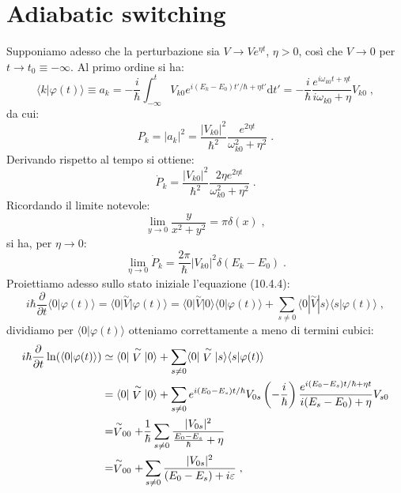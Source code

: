 \documentclass[10pt,a4paper]{report}
\theoremstyle{definition}
\numberwithin{equation}{section}
\newcommand{\diff}[1][]{\mathrm{d}#1}
\newcommand{\bra}{\langle}
\newcommand{\ket}{\rangle}
\begin{document}
\section{Adiabatic switching}
Supponiamo adesso che la perturbazione sia $V\to Ve^{\eta t}$, $\eta>0$, così che $V\to 0$ per $t\to t_0\equiv -\infty$. Al primo ordine si ha:
\begin{equation}
\bra k|\varphi(t)\ket\equiv a_k=-\frac{i}{\hbar}\int_{-\infty}^t V_{k0}e^{i(E_k-E_0)t'/\hbar+\eta t'}\diff{t}'=
-\frac{i}{\hbar}\frac{e^{i\omega_{k0}t+\eta t}}{i\omega_{k0}+\eta}V_{k0}\;,
\end{equation}
da cui:
\begin{equation}
P_k=|a_k|^2=\frac{|V_{k0}|^2}{\hbar^2}\frac{e^{2\eta t}}{\omega_{k0}^2+\eta^2}\;.
\end{equation}
Derivando rispetto al tempo si ottiene:
\begin{equation}
\dot{P}_k=\frac{|V_{k0}|^2}{\hbar^2}\frac{2\eta e^{2\eta t}}{\omega_{k0}^2+\eta^2}\;.
\end{equation}
Ricordando il limite notevole:
\begin{equation}
\lim_{y\to 0}\frac{y}{x^2+y^2}=\pi\delta(x)\;,
\end{equation}
si ha, per $\eta\to 0$:
\begin{equation}
\lim_{\eta\to 0}\dot{P}_k=\frac{2\pi}{\hbar}|V_{k0}|^2\delta(E_k-E_0)\;.
\end{equation}
Proiettiamo adesso sullo stato iniziale l'equazione (10.4.4):
\begin{equation}
i\hbar\frac{\partial}{\partial t}\bra 0|\varphi(t)\ket=\bra 0|\stackrel{\sim}{V}|\varphi(t)\ket=
\bra 0|\stackrel{\sim}{V}|0\ket\bra 0|\varphi(t)\ket+\sum_{s\ne 0}\bra 0|\stackrel{\sim}{V}|s\ket\bra s|\varphi(t)\ket\;,
\end{equation}
dividiamo per $\bra 0|\varphi(t)\ket$ otteniamo correttamente a meno di termini cubici:
\begin{align}
i\hbar\frac{\partial}{\partial t}\ln(\bra 0|\varphi(t)\ket)&\simeq \bra 0|\stackrel{\sim}{V}|0\ket+\sum_{s\ne 0}\bra 0|\stackrel{\sim}{V}|s\ket\bra s|\varphi(t)\ket \notag \\
&=\bra 0|\stackrel{\sim}{V}|0\ket+\sum_{s\ne 0}e^{i(E_0-E_s)t/\hbar}V_{0s}\left(-\frac{i}{\hbar}\right)\frac{e^{i(E_0-E_s)t/\hbar+\eta t}}{i(E_s-E_0)+\eta}V_{s0} \notag \\
&=\stackrel{\sim}{V}_{00}+\frac{1}{\hbar}\sum_{s\ne 0}\frac{|V_{0s}|^2}{\frac{E_0-E_s}{\hbar}+\eta} \notag \\
&=\stackrel{\sim}{V}_{00}+\sum_{s\ne 0}\frac{|V_{0s}|^2}{(E_0-E_s)+i\varepsilon}\;,
\end{align}
\end{document}
